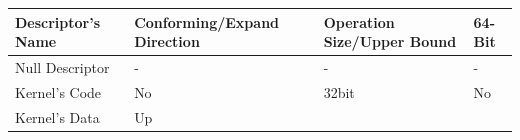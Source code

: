 \begin{longtable}[]{@{}llll@{}}
\toprule
\begin{minipage}[b]{0.20\columnwidth}\raggedright\strut
Descriptor's Name\strut
\end{minipage} & \begin{minipage}[b]{0.30\columnwidth}\raggedright\strut
Conforming/Expand Direction\strut
\end{minipage} & \begin{minipage}[b]{0.29\columnwidth}\raggedright\strut
Operation Size/Upper Bound\strut
\end{minipage} & \begin{minipage}[b]{0.09\columnwidth}\raggedright\strut
64-Bit\strut
\end{minipage}\tabularnewline
\midrule
\endhead
\begin{minipage}[t]{0.20\columnwidth}\raggedright\strut
Null Descriptor\strut
\end{minipage} & \begin{minipage}[t]{0.30\columnwidth}\raggedright\strut
-\strut
\end{minipage} & \begin{minipage}[t]{0.29\columnwidth}\raggedright\strut
-\strut
\end{minipage} & \begin{minipage}[t]{0.09\columnwidth}\raggedright\strut
-\strut
\end{minipage}\tabularnewline
\begin{minipage}[t]{0.20\columnwidth}\raggedright\strut
Kernel's Code\strut
\end{minipage} & \begin{minipage}[t]{0.30\columnwidth}\raggedright\strut
No\strut
\end{minipage} & \begin{minipage}[t]{0.29\columnwidth}\raggedright\strut
32bit\strut
\end{minipage} & \begin{minipage}[t]{0.09\columnwidth}\raggedright\strut
No\strut
\end{minipage}\tabularnewline
\begin{minipage}[t]{0.20\columnwidth}\raggedright\strut
Kernel's Data\strut
\end{minipage} & \begin{minipage}[t]{0.30\columnwidth}\raggedright\strut
Up\strut
\end{minipage} & \begin{minipage}[t]{0.29\columnwidth}\raggedright\strut

\end{minipage}
\end{longtable}

